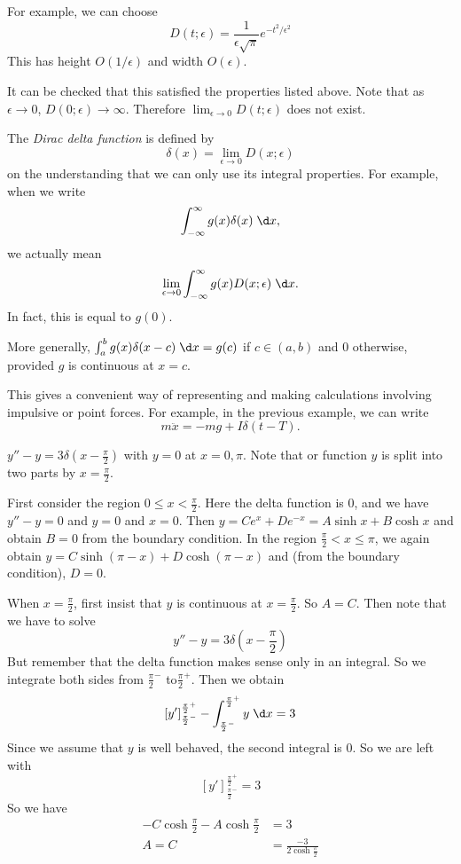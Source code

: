 \documentclass[a4paper]{article}
\begin{document}
For example, we can choose 
\[
D(t; \epsilon) = \frac{1}{\epsilon\sqrt{\pi}}e^{-t^2/\epsilon^2}
\]
This has height $O(1/\epsilon)$ and width $O(\epsilon)$.

It can be checked that this satisfied the properties listed above. Note that as $\epsilon \to 0$, $D(0; \epsilon)\to \infty$. Therefore $\displaystyle \lim_{\epsilon\to 0} D(t; \epsilon)$ does not exist.

\begin{defi}
  The \emph{Dirac delta function} is defined by 
  \[
  \delta(x) = \lim_{\epsilon \to 0} D(x; \epsilon)
  \]
  on the understanding that we can only use its integral properties. For example, when we write
  \[
  \int_{-\infty}^{\infty} g(x)\delta (x) \;\d x,
  \]
  we actually mean
  \[
  \lim_{\epsilon \to 0} \int_{-\infty}^{\infty} g(x)D(x; \epsilon)\;\d x.
  \]
  In fact, this is equal to $g(0)$. 

  More generally, $\int_a^b g(x)\delta(x - c)\;\d x = g(c)$ if $c\in (a, b)$ and $0$ otherwise, provided $g$ is continuous at $x = c$.
\end{defi}

This gives a convenient way of representing and making calculations involving impulsive or point forces. For example, in the previous example, we can write
\[
m\ddot x = -mg + I\delta(t - T).
\]

\begin{eg}
  $y'' - y = 3\delta(x - \frac{\pi}{2})$ with $y = 0$ at $x = 0, \pi$. Note that or function $y$ is split into two parts by $x = \frac{\pi}{2}$.

First consider the region $0 \leq x < \frac{\pi}{2}$. Here the delta function is $0$, and we have $y'' - y = 0$ and $y = 0$ and $x = 0$. Then $y = Ce^x + De^{-x} = A\sinh x + B\cosh x$ and obtain $B = 0$ from the boundary condition. 
In the region $\frac{\pi}{2} < x \leq \pi$, we again obtain $y = C\sinh(\pi - x) + D\cosh (\pi - x)$ and (from the boundary condition), $D = 0$.

When $x = \frac{\pi}{2}$, first insist that $y$ is continuous at $x = \frac{\pi}{2}$. So $A = C$. Then note that we have to solve 
\[
y'' - y = 3\delta\left(x - \frac{\pi}{2}\right)
\]
But remember that the delta function makes sense only in an integral. So we integrate both sides from $\frac{\pi}{2}^-$ to$\frac{\pi}{2}^+$. Then we obtain
\[
[y']^{\frac{\pi}{2}^+}_{\frac{\pi}{2}^-} - \int_{\frac{\pi}{2}^-}^{\frac{\pi}{2}^+} y\;\d x= 3
\]
Since we assume that $y$ is well behaved, the second integral is 0. So we are left with 
\[
[y']^{\frac{\pi}{2}^+}_{\frac{\pi}{2}^-} = 3
\]
So we have 
\begin{align*}
  -C\cosh \frac{\pi}{2} - A\cosh\frac{\pi}{2} &= 3\\
  A = C &= \frac{-3}{2\cosh \frac{\pi}{2}}
\end{align*}
\end{eg}
\end{document}
